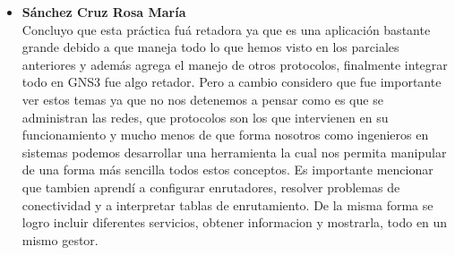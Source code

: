 
\begin{itemize}
\item \textbf{Sánchez Cruz Rosa María}
\\
Concluyo que esta práctica fuá retadora ya que es una aplicación bastante grande debido a que maneja todo lo que hemos visto en los parciales anteriores y además agrega el manejo de otros protocolos, finalmente integrar todo en GNS3 fue algo retador. Pero a cambio considero que fue importante ver estos temas ya que no nos detenemos a pensar como es que se administran las redes, que protocolos son los que intervienen en su funcionamiento y mucho menos de que forma nosotros como ingenieros en sistemas podemos desarrollar una
herramienta la cual nos permita manipular de una forma más sencilla todos estos conceptos.
Es importante mencionar que tambien aprendí a configurar enrutadores, resolver problemas de conectividad y a interpretar tablas de enrutamiento. De la misma forma se logro incluir diferentes servicios, obtener informacion y mostrarla, todo en un mismo gestor.
\end{itemize}
